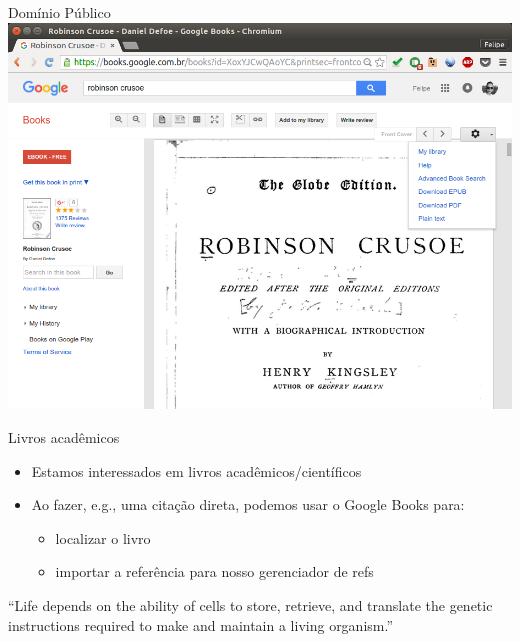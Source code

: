 \documentclass{beamer}
\begin{document}
\begin{frame}{Domínio Público}
  \includegraphics[height=.85\textheight]{Busca/gbooks-publicdomain}
\end{frame}

\begin{frame}{Livros acadêmicos}
  \begin{itemize}
  \item Estamos interessados em livros acadêmicos/científicos
  \item Ao fazer, e.g., uma citação direta, podemos usar o Google
    Books para:
    \begin{itemize}
    \item localizar o livro
    \item importar a referência para nosso gerenciador de refs
    \end{itemize}
  \end{itemize}
  \begin{example}
    ``Life depends on the ability of cells to store, retrieve, and
    translate the genetic instructions required to make and maintain a
    living organism.''
  \end{example}
\end{frame}
\end{document}
